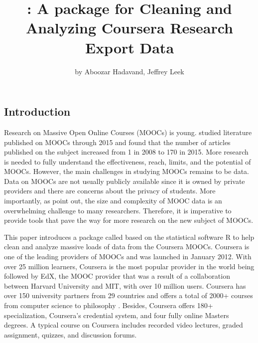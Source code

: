 \title{: A package for Cleaning and Analyzing Coursera Research
Export Data}
\author{by Aboozar Hadavand, Jeffrey Leek}

\maketitle


\subsection{Introduction}\label{introduction}

Research on Massive Open Online Courses (MOOCs) is young.
\cite{bozkurt2017trends} studied literature published on MOOCs through
2015 and found that the number of articles published on the subject
increased from 1 in 2008 to 170 in 2015. More research is needed to
fully understand the effectiveness, reach, limits, and the potential of
MOOCs. However, the main challenges in studying MOOCs remains to be
data. Data on MOOCs are not usually publicly available since it is owned
by private providers and there are concerns about the privacy of
students. More importantly, as \cite{lopez2017google} point out, the
size and complexity of MOOC data is an overwhelming challenge to many
researchers. Therefore, it is imperative to provide tools that pave the
way for more research on the new subject of MOOCs.

This paper introduces a package called  \citep{crsra} based
on the statistical software R to help clean and analyze massive loads of
data from the Coursera MOOCs. Coursera is one of the leading providers
of MOOCs and was launched in January 2012. With over 25 million
learners, Coursera is the most popular provider in the world being
followed by EdX, the MOOC provider that was a result of a collaboration
between Harvard University and MIT, with over 10 million users. Coursera
has over 150 university partners from 29 countries and offers a total of
2000+ courses from computer science to philosophy \citep{coursera}.
Besides, Coursera offers 180+ specialization, Coursera's credential
system, and four fully online Masters degrees. A typical course on
Coursera includes recorded video lectures, graded assignment, quizzes,
and discussion forums.

